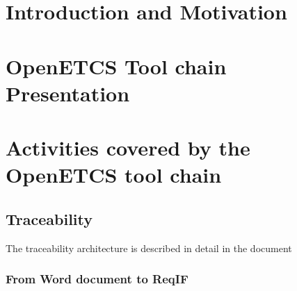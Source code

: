 \documentclass{template/openetcs_report}
\begin{document}
\printglossary
\mainmatter
\chapter{Introduction and Motivation}



\chapter{OpenETCS Tool chain Presentation}
\label{chap:toolchaindef}




\chapter{Activities covered by the OpenETCS tool chain}
\label{chap:reqhandling}

  \section{Traceability}
The traceability architecture is described in detail in the document \cite{O7_trace}
    \subsection{From Word document to ReqIF}
\end{document}
